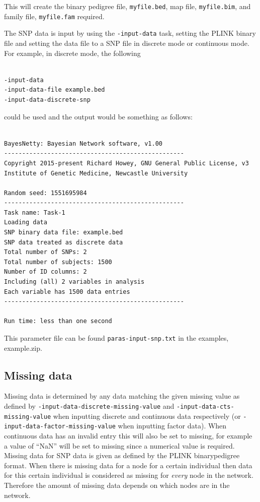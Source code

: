 \documentclass[a4paper,12pt]{article}
\newcommand{\code}[1]{{\footnotesize{{\tt #1}}}}
\begin{document}
This will create the binary pedigree file, \code{myfile.bed}, map file, \code{myfile.bim}, and family file, \code{myfile.fam} required. 

The SNP data is input by using the \code{-input-data} task, setting the PLINK binary file and setting the data file to a SNP file in discrete mode or continuous mode. For example, in discrete mode, the following 
\vspace{0.35cm} \begin{lstlisting}

-input-data
-input-data-file example.bed
-input-data-discrete-snp

\end{lstlisting} \vspace{0.35cm}
could be used and the output would be something as follows: 
\vspace{0.35cm} \begin{lstlisting}

BayesNetty: Bayesian Network software, v1.00
--------------------------------------------------
Copyright 2015-present Richard Howey, GNU General Public License, v3
Institute of Genetic Medicine, Newcastle University

Random seed: 1551695984
--------------------------------------------------
Task name: Task-1
Loading data
SNP binary data file: example.bed
SNP data treated as discrete data
Total number of SNPs: 2
Total number of subjects: 1500
Number of ID columns: 2
Including (all) 2 variables in analysis
Each variable has 1500 data entries
--------------------------------------------------

Run time: less than one second

\end{lstlisting} \vspace{0.35cm}
This parameter file can be found \code{paras-input-snp.txt} in the examples, example.zip. 


\subsection{Missing data}
\label{input-data-missing}

Missing data is determined by any data matching the given missing value as defined by \code{-input-data-discrete-missing-value} and \code{-input-data-cts-missing-value} when inputting discrete and continuous data respectively (or \code{-input-data-factor-missing-value} when inputting factor data). When continuous data has an invalid entry this will also be set to missing, for example a value of ``NaN'' will be set to missing since a numerical value is required. Missing data for SNP data is given as defined by the PLINK binarypedigree format. When there is missing data for a node for a certain individual then data for this certain individual is considered as missing for {\it every} node in the network. Therefore the amount of missing data depends on which nodes are in the network. 
\end{document}
